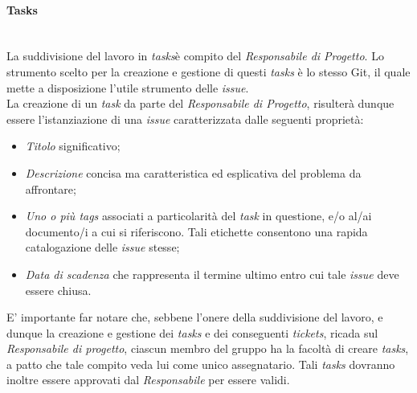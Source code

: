 \paragraph{Tasks} ~\\
	La suddivisione del lavoro in \textit{tasks}\glossario è compito del \textit{Responsabile di Progetto}. Lo strumento scelto per la creazione e gestione di questi \textit{tasks} è lo stesso Git\glossario, il quale mette a disposizione l'utile strumento delle \textit{issue}.\\
	La creazione di un \textit{task} da parte del \textit{Responsabile di Progetto}, risulterà dunque essere l'istanziazione di una \textit{issue} caratterizzata dalle seguenti proprietà:
	\begin{itemize}
	\item \textit{Titolo} significativo;
	\item \textit{Descrizione} concisa ma caratteristica ed esplicativa del problema da affrontare;
	\item \textit{Uno o più tags} associati a particolarità del \textit{task} in questione, e/o al/ai documento/i a cui si riferiscono. Tali etichette consentono una rapida catalogazione delle \textit{issue} stesse;
	\item \textit{Data di scadenza} che rappresenta il termine ultimo entro cui tale \textit{issue} deve essere chiusa.
	\end{itemize}
	E' importante far notare che, sebbene l'onere della suddivisione del lavoro, e dunque la creazione e gestione dei \textit{tasks} e dei conseguenti \textit{tickets}\glossario, ricada sul \textit{Responsabile di progetto}, ciascun membro del gruppo ha la facoltà di creare \textit{tasks}, a patto che tale compito veda lui come unico assegnatario. Tali \textit{tasks} dovranno inoltre essere approvati dal \textit{Responsabile} per essere validi.

